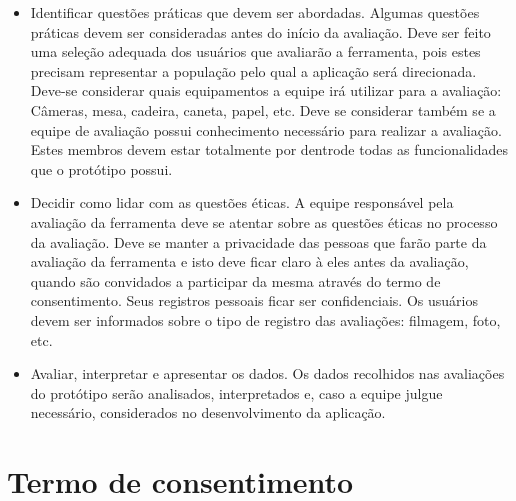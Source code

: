     \begin{itemize}
    
       \item Identificar questões práticas que devem ser abordadas.
       \subitem Algumas questões práticas devem ser consideradas antes do início da avaliação. Deve ser feito uma seleção adequada dos usuários 
       que avaliarão a ferramenta, pois estes precisam representar a população pelo qual a aplicação será direcionada. Deve-se considerar quais 
       equipamentos a equipe irá utilizar para a avaliação: Câmeras, mesa, cadeira, caneta, papel, etc. Deve se considerar também se a equipe
       de avaliação possui conhecimento necessário para realizar a avaliação. Estes membros devem estar totalmente por dentrode todas as 
       funcionalidades que o protótipo possui. 
       
    \end{itemize}
       
    \begin{itemize}
    
       \item Decidir como lidar com as questões éticas.
       \subitem A equipe responsável pela avaliação da ferramenta deve se atentar sobre as questões éticas no processo da avaliação. Deve se manter a 
       privacidade das pessoas que farão parte da avaliação da ferramenta e isto deve ficar claro à eles antes da avaliação, quando são convidados a 
       participar da mesma através do termo de consentimento. Seus registros pessoais ficar ser confidenciais. Os usuários devem ser informados sobre 
       o tipo de registro das avaliações: filmagem, foto, etc.
       
    \end{itemize}
       
    \begin{itemize}
    
       \item Avaliar, interpretar e apresentar os dados.
       \subitem Os dados recolhidos nas avaliações do protótipo serão analisados, interpretados e, caso a equipe julgue necessário, considerados no desenvolvimento da aplicação.
   
   \end{itemize}
   
   \section{Termo de consentimento}
   
